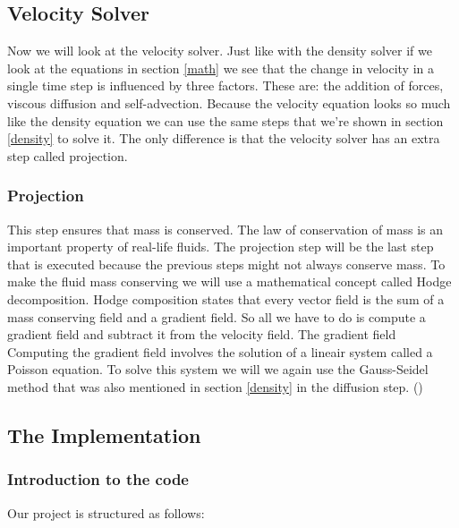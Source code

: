 \documentclass[a4paper,12pt]{article}
\begin{document}
\subsection{Velocity Solver} \label{velocity}
Now we will look at the velocity solver. Just like with the density solver if we look at the equations in section \ref{math}
we see that the change in velocity in a single time step is influenced by three factors. 
These are: the addition of forces, viscous diffusion and self-advection. 
Because the velocity equation looks so much like the density equation we can use the same steps that we're shown in section \ref{density} to solve it.
The only difference is that the velocity solver has an extra step called projection.

\subsubsection{Projection}
This step ensures that mass is conserved. 
The law of conservation of mass is an important property of real-life fluids.
The projection step will be the last step that is executed because the previous steps might not always conserve mass.
To make the fluid mass conserving we will use a mathematical concept called Hodge decomposition.
Hodge composition states that every vector field is the sum of a mass conserving field and a gradient field.
So all we have to do is compute a gradient field and subtract it from the velocity field. 
The gradient field 
Computing the gradient field involves the solution of a lineair system called a Poisson equation.
To solve this system we will we again use the Gauss-Seidel method that was also mentioned in section \ref{density} in the diffusion step. (\cite{josstam})

\subsection{The Implementation}
\subsubsection{Introduction to the code}
Our project is structured as follows:
\end{document}
